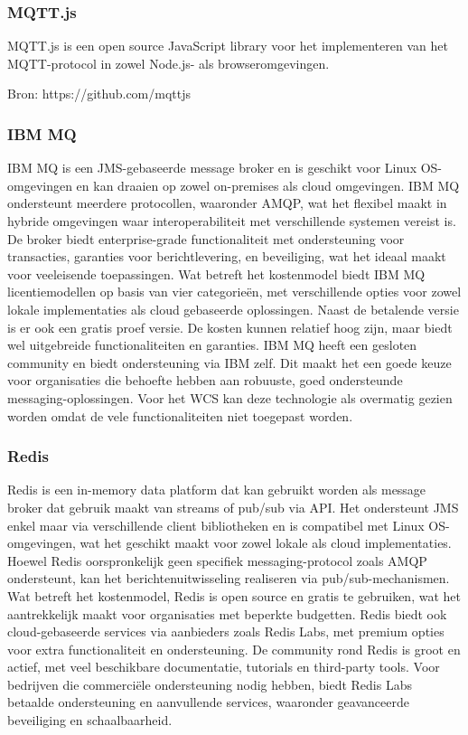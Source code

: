 \subsubsection{MQTT.js}
MQTT.js is een open source JavaScript library voor het implementeren van het MQTT-protocol in zowel Node.js- als browseromgevingen.

Bron: https://github.com/mqttjs

\subsubsection{IBM MQ}
IBM MQ is een JMS-gebaseerde message broker en is geschikt voor Linux OS-omgevingen en kan draaien op zowel on-premises als cloud omgevingen.
IBM MQ ondersteunt meerdere protocollen, waaronder AMQP, wat het flexibel maakt in hybride omgevingen waar interoperabiliteit met verschillende systemen vereist is.
De broker biedt enterprise-grade functionaliteit met ondersteuning voor transacties, garanties voor berichtlevering, en beveiliging, wat het ideaal maakt voor veeleisende toepassingen.
Wat betreft het kostenmodel biedt IBM MQ licentiemodellen op basis van vier categorieën, 
met verschillende opties voor zowel lokale implementaties als cloud gebaseerde oplossingen.
Naast de betalende versie is er ook een gratis proef versie.
De kosten kunnen relatief hoog zijn, maar biedt wel uitgebreide functionaliteiten en garanties.
IBM MQ heeft een gesloten community en biedt ondersteuning via IBM zelf. 
Dit maakt het een goede keuze voor organisaties die behoefte hebben aan robuuste, goed ondersteunde messaging-oplossingen.
Voor het WCS kan deze technologie als overmatig gezien worden omdat de vele functionaliteiten niet toegepast worden.

\subsubsection{Redis}
Redis is een in-memory data platform dat kan gebruikt worden als message broker dat gebruik maakt van streams of pub/sub via API. 
Het ondersteunt JMS enkel maar via verschillende client bibliotheken en is compatibel met Linux OS-omgevingen, 
wat het geschikt maakt voor zowel lokale als cloud implementaties.
Hoewel Redis oorspronkelijk geen specifiek messaging-protocol zoals AMQP ondersteunt, 
kan het berichtenuitwisseling realiseren via pub/sub-mechanismen. 
Wat betreft het kostenmodel, Redis is open source en gratis te gebruiken, wat het aantrekkelijk maakt voor organisaties met beperkte budgetten. 
Redis biedt ook cloud-gebaseerde services via aanbieders zoals Redis Labs, met premium opties voor extra functionaliteit en ondersteuning.
De community rond Redis is groot en actief, met veel beschikbare documentatie, tutorials en third-party tools. 
Voor bedrijven die commerciële ondersteuning nodig hebben, biedt Redis Labs betaalde ondersteuning en aanvullende services, waaronder geavanceerde beveiliging en schaalbaarheid.


